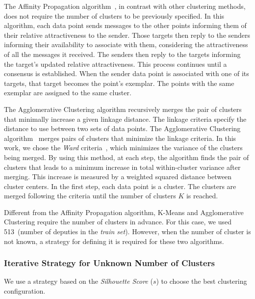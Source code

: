 The Affinity Propagation algorithm~\cite{frey2007clustering}, in contrast with other clustering methods, does not require the number of clusters to be previously specified.
In this algorithm, each data point sends messages to the other points informing them of their relative attractiveness to the sender. 
Those targets then reply to the senders informing their availability to associate with them, considering the attractiveness of all the messages it received.
The senders then reply to the targets informing the target's updated relative attractiveness.
This process continues until a consensus is established.
When the sender data point is associated with one of its targets, that target becomes the point's exemplar.
The points with the same exemplar are assigned to the same cluster.

The Agglomerative Clustering algorithm recursively merges the pair of clusters that minimally increase a given linkage distance.
The linkage criteria specify the distance to use between two sets of data points.
The Agglomerative Clustering algorithm~\cite{ward1963hierarchical} merges pairs of clusters that minimize the linkage criteria.
In this work, we chose the \emph{Ward} criteria~\cite{ward1963hierarchical}, which minimizes the variance of the clusters being merged.
By using this method, at each step, the algorithm finds the pair of clusters that leads to a minimum increase in total within-cluster variance after merging.
This increase is measured by a weighted squared distance between cluster centers.
In the first step, each data point is a cluster.
The clusters are merged following the criteria until the number of clusters $K$ is reached.

Different from the Affinity Propagation algorithm, K-Means and Agglomerative Clustering require the number of clusters in advance. For this case, we used 513~(number of deputies in the \emph{train set}).
However, when the number of cluster is not known, a strategy for defining it is required for these two algorithms.

\subsubsection{Iterative Strategy for Unknown Number of Clusters}
\label{subsec:unknown_nclusters}

We use a strategy based on the \emph{Silhouette Score} ($s$) \cite{rousseeuw1987silhouettes} to choose the best clustering configuration.

